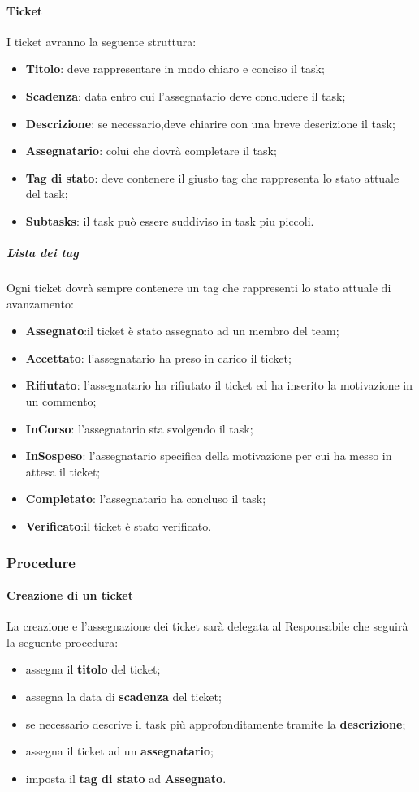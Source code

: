 	\paragraph{Ticket}
	 I ticket avranno la seguente struttura:
	 \begin{itemize}
	 	\item \textbf{Titolo}: deve rappresentare in modo chiaro e conciso il task;
	 	\item \textbf{Scadenza}: data entro cui l'assegnatario deve concludere il task;
	 	\item \textbf{Descrizione}: se necessario,deve chiarire con una breve descrizione il task;
	 	\item \textbf{Assegnatario}: colui che dovrà completare il task;
	 	\item \textbf{Tag di stato}: deve contenere il giusto tag che rappresenta lo stato attuale del task; 
	 	\item \textbf{Subtasks}: il task può essere suddiviso in task piu piccoli.
	 	\end{itemize}
	 	\subparagraph{Lista dei tag}
	 	Ogni ticket dovrà sempre contenere un tag che rappresenti lo stato attuale di avanzamento:
	 	\begin{itemize}
	 		\item \textbf{Assegnato}:il ticket è stato assegnato ad un membro del team;
	 		\item \textbf{Accettato}: l'assegnatario ha preso in carico il ticket;
	 		\item \textbf{Rifiutato}: l'assegnatario ha rifiutato il ticket ed ha inserito la motivazione in un commento;
	 		\item \textbf{InCorso}: l'assegnatario sta svolgendo il task;
	 		\item \textbf{InSospeso}: l'assegnatario specifica della motivazione per cui ha messo in attesa il ticket;
	 		\item \textbf{Completato}: l'assegnatario ha concluso il task;
	 		\item \textbf{Verificato}:il ticket è stato verificato.
	 		\end{itemize}
\subsubsection{Procedure}
	\paragraph{Creazione di un ticket}
	La creazione e l'assegnazione dei ticket sarà delegata al Responsabile che seguirà la seguente procedura:
	\begin{itemize}
		\item assegna il \textbf{titolo} del ticket;
		\item assegna la data di \textbf{scadenza} del ticket;
		\item se necessario descrive il task più approfonditamente tramite la \textbf{descrizione};
		\item assegna il ticket ad un \textbf{assegnatario};
		\item imposta il \textbf{tag di stato} ad \textbf{Assegnato}.
	\end{itemize}
